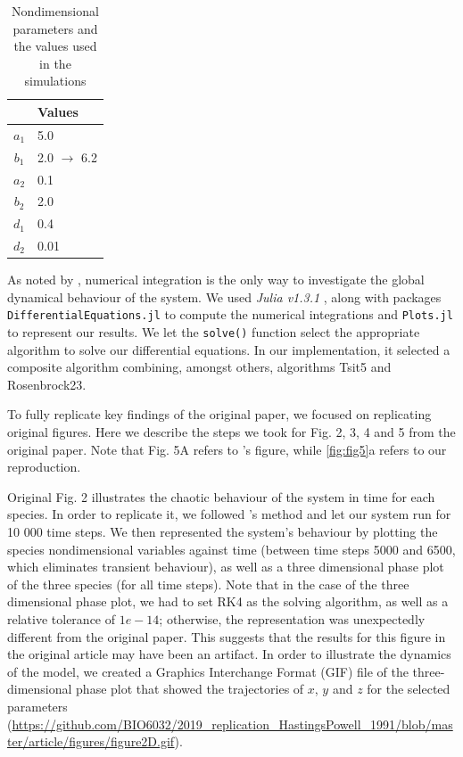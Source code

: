 \begin{table}[!htb]
  \centering
  \caption{Nondimensional parameters and the values used in the simulations}
  \label{tbl:table1}
  \begin{tabular}{c l}
    \hline
    & Values \\
    \hline
    $a_1$ & 5.0 \\
    $b_1$ & 2.0 $\rightarrow$ 6.2 \\
    $a_2$ & 0.1 \\
    $b_2$ & 2.0 \\
    $d_1$ & 0.4 \\
    $d_2$ & 0.01 \\
    \hline
  \end{tabular}
\end{table}

As noted by \citeauthor{hastings1991}, numerical integration is the only way to investigate the
global dynamical behaviour of the system.
We used \textit{Julia v1.3.1} \citep{bezanson2017}, along with packages \verb| DifferentialEquations.jl|
\citep{rackauckas2017} to compute the numerical integrations and \verb|Plots.jl| to represent
our results. We let the \verb|solve()| function select the appropriate algorithm to solve our
differential equations.
In our implementation, it selected a composite algorithm combining, amongst others,
algorithms Tsit5 and Rosenbrock23.

To fully replicate key findings of the original paper, we focused on replicating
original figures.
Here we describe the steps we took for Fig. 2, 3, 4 and 5 from the original paper.
Note that Fig. 5A refers to \citeauthor{hastings1991}'s figure, while \autoref{fig:fig5}a
refers to our reproduction.

Original Fig. 2 illustrates the chaotic behaviour of the system in time for each species.
In order to replicate it, we followed \citeauthor{hastings1991}'s method and let our system
run for 10 000 time steps.
We then represented the system's behaviour by plotting the species nondimensional
variables against time (between time steps 5000 and 6500, which eliminates transient
behaviour), as well as a three dimensional phase plot of the three species (for all time
steps). Note that in the case of the three dimensional phase plot, we had to set RK4 as
the solving algorithm, as well as a relative tolerance of $1e-14$; otherwise, the
representation was unexpectedly different from the original paper.
This suggests that the results for this figure in the original article may have been an
artifact.
In order to illustrate the dynamics of the model, we created a Graphics Interchange Format
(GIF) file of the three-dimensional phase plot that showed the trajectories of $x$, $y$
and $z$ for the selected parameters (\url{https://github.com/BIO6032/2019_replication_HastingsPowell_1991/blob/master/article/figures/figure2D.gif}).

